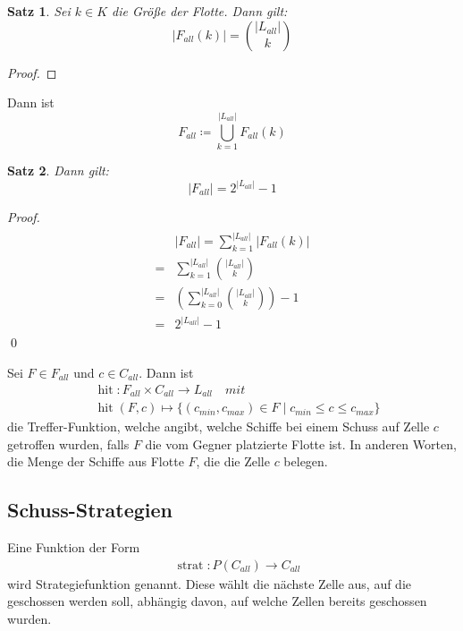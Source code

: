 \documentclass[a4paper,12pt]{llncs}
\numberwithin{equation}{section}
\newtheorem{satz}{Satz}
\DeclareMathOperator{\hit}{hit}
\DeclareMathOperator{\strat}{strat}
\begin{document}
\begin{satz}
Sei $k \in K$ die Größe der Flotte.
Dann gilt:
\[
|F_{all}(k)|=\binom{|L_{all}|}{k}
\]
\end{satz}

\begin{proof}
\end{proof}

\begin{definition}
Dann ist
\[
F_{all} \coloneqq \bigcup_{k=1}^{|L_{all}|} F_{all}(k)
\]
\end{definition}

\begin{satz}
Dann gilt:
\[
|F_{all}|=2^{|L_{all}|} - 1
\]
\end{satz}

\begin{proof}
\begin{align}
\begin{split}
&|F_{all}|=\sum_{k=1}^{|L_{all}|} |F_{all}(k)|\\
=&\sum_{k=1}^{|L_{all}|} \binom{|L_{all}|}{k} \\
=&\left( \sum_{k=0}^{|L_{all}|} \binom{|L_{all}|}{k} \right) - 1 \\
=&2^{|L_{all}|} - 1
\end{split}
\end{align}
\qed
\end{proof}


\begin{definition}
Sei $F \in F_{all}$ und $c \in C_{all}$.
Dann ist 
\begin{align}
&\hit:F_{all} \times C_{all} \rightarrow L_{all} \quad mit \nonumber\\
&\hit(F, c)\mapsto \{(c_{min}, c_{max}) \in F \mid c_{min} \leq c \leq c_{max}\} \nonumber
\end{align}
die Treffer-Funktion, welche angibt, welche Schiffe bei einem Schuss auf Zelle $c$ getroffen wurden, falls $F$ die vom Gegner platzierte Flotte ist. In anderen Worten, die Menge der Schiffe aus Flotte $F$, die die Zelle $c$ belegen.
\end{definition}

\subsection{Schuss-Strategien}

\begin{definition}
Eine Funktion der Form
\begin{align}
&\strat:P(C_{all}) \rightarrow C_{all} \nonumber
\end{align}
wird Strategiefunktion genannt. Diese wählt die nächste Zelle aus, auf die geschossen werden soll, abhängig davon, auf welche Zellen bereits geschossen wurden.
\end{definition}
\end{document}
